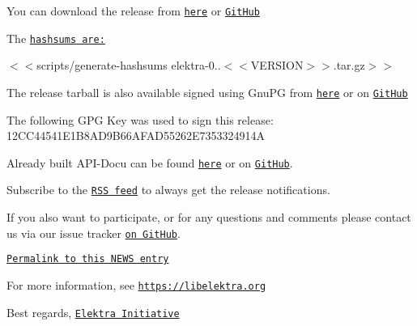 You can download the release from \href{https://www.libelektra.org/ftp/elektra/releases/elektra-0.9.<<VERSION>>.tar.gz}{\tt here} or \href{https://github.com/ElektraInitiative/ftp/blob/master/releases/elektra-0.9.<<VERSION>>.tar.gz?raw=true}{\tt Git\+Hub}

The \href{https://github.com/ElektraInitiative/ftp/blob/master/releases/elektra-0.9.<<VERSION>>.tar.gz.hashsum?raw=true}{\tt hashsums are\+:}

$<$$<${\ttfamily scripts/generate-\/hashsums elektra-\/0..$<$$<$V\+E\+R\+S\+I\+ON$>$$>$.tar.\+gz}$>$$>$

The release tarball is also available signed using Gnu\+PG from \href{https://www.libelektra.org/ftp/elektra/releases/elektra-0.9.<<VERSION>>.tar.gz.gpg}{\tt here} or on \href{https://github.com/ElektraInitiative/ftp/blob/master/releases/elektra-0.9.<<VERSION>>.tar.gz.gpg?raw=true}{\tt Git\+Hub}

The following G\+PG Key was used to sign this release\+: 12\+C\+C44541\+E1\+B8\+A\+D9\+B66\+A\+F\+A\+D55262\+E7353324914A

Already built A\+P\+I-\/\+Docu can be found \href{https://doc.libelektra.org/api/0.9.<<VERSION>>/html/}{\tt here} or on \href{https://github.com/ElektraInitiative/doc/tree/master/api/0.9.<<VERSION>}{\tt Git\+Hub}.

Subscribe to the \href{https://www.libelektra.org/news/feed.rss}{\tt R\+SS feed} to always get the release notifications.

If you also want to participate, or for any questions and comments please contact us via our issue tracker \href{http://issues.libelektra.org}{\tt on Git\+Hub}.

\href{https://www.libelektra.org/news/0.9.<<VERSION>>-release}{\tt Permalink to this N\+E\+WS entry}

For more information, see \href{https://libelektra.org}{\tt https\+://libelektra.\+org}

Best regards, \href{https://www.libelektra.org/developers/authors}{\tt Elektra Initiative} 